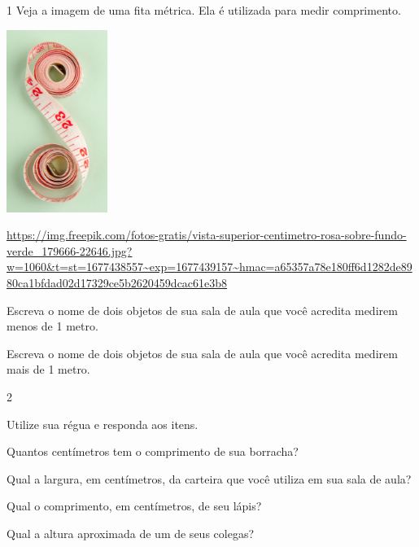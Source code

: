 \num{1} Veja a imagem de uma fita métrica. Ela é utilizada para medir comprimento.

\includegraphics[width=1.29167in,height=2.33463in]{media/image41.png}

\url{https://img.freepik.com/fotos-gratis/vista-superior-centimetro-rosa-sobre-fundo-verde_179666-22646.jpg?w=1060\&t=st=1677438557~exp=1677439157~hmac=a65357a78e180ff6d1282de8980ca1bfdad02d17329ce5b2620459dcac61e3b8}

\begin{escolha}

\item
  Escreva o nome de dois objetos de sua sala de aula que você acredita
  medirem menos de 1 metro.

\item
  Escreva o nome de dois objetos de sua sala de aula que você acredita
  medirem mais de 1 metro.

\end{escolha}

\num{2}

Utilize sua régua e responda aos itens.

\begin{escolha}

\item
  Quantos centímetros tem o comprimento de sua borracha?

\item
  Qual a largura, em centímetros, da carteira que você utiliza em sua
  sala de aula?

\item
  Qual o comprimento, em centímetros, de seu lápis?

\item
  Qual a altura aproximada de um de seus colegas?

\end{escolha}

